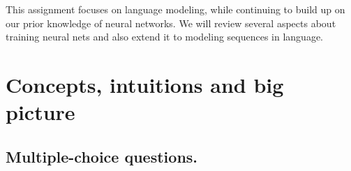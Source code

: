 

\usepackage{macros}

\author{
\Large
Homework 4: Neural Language Modeling + Fixed-Window LMs
}




\maketitle
This assignment focuses on language modeling, while continuing to build up on our prior knowledge of neural networks. 
We will review several aspects about training neural nets and also extend it to modeling sequences in language. 


\noindent{}

\vspace{0.5cm}


\additionalNotes


\clearpage


\section{Concepts, intuitions and big picture}

\subsection{Multiple-choice questions. }


